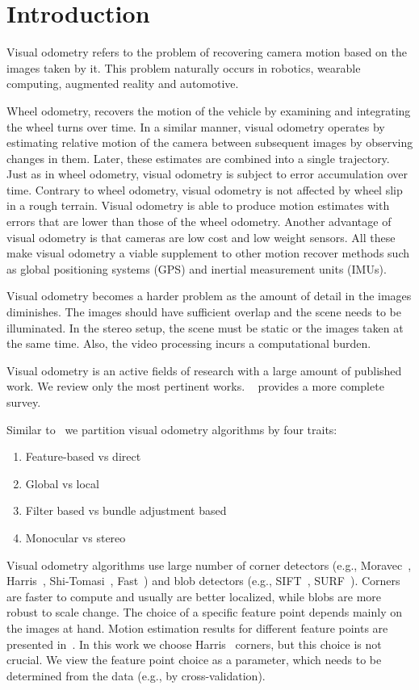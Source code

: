 \chapter{Introduction}
\label{chap:intro}

Visual odometry refers to the problem of recovering camera motion
based on the images taken by it. This problem naturally occurs in
robotics, wearable computing, augmented reality and automotive.

Wheel odometry, recovers the motion of the vehicle by examining and
integrating the wheel turns over time.  In a similar manner, visual
odometry operates by estimating relative motion of the camera between
subsequent images by observing changes in them. Later, these estimates
are combined into a single trajectory. Just as in wheel odometry,
visual odometry is subject to error accumulation over time. Contrary
to wheel odometry, visual odometry is not affected by wheel slip in a
rough terrain. Visual odometry is able to produce motion estimates
with errors that are lower than those of the wheel odometry. Another
advantage of visual odometry is that cameras are low cost and low
weight sensors.  All these make visual odometry a viable supplement to
other motion recover methods such as global positioning systems (GPS)
and inertial measurement units (IMUs).

Visual odometry becomes a harder problem as the amount of detail in
the images diminishes. The images should have sufficient overlap and
the scene needs to be illuminated.  In the stereo setup, the scene
must be static or the images taken at the same time. Also, the video
processing incurs a computational burden.

Visual odometry is an active fields of research with a large amount of
published work.  We review only the most pertinent works.
~\cite{Scaramuzza2011} provides a more complete survey.

Similar to~\cite{Persson2015} we partition visual odometry algorithms
by four traits:
\begin{enumerate}
\item Feature-based vs direct
\item Global vs local
\item Filter based vs bundle adjustment based
\item Monocular vs stereo
\end{enumerate}

Visual odometry algorithms use large number of corner detectors
(e.g., Moravec~\cite{Moravec1980}, Harris~\cite{Harris1987},
Shi-Tomasi~\cite{Shi1994}, Fast~\cite{Rosten2006}) and blob detectors
(e.g., SIFT~\cite{Lowe2004}, SURF~\cite{Bay2006}). Corners are faster to
compute and usually are better localized, while blobs are more robust
to scale change. The choice of a specific feature point depends mainly
on the images at hand.  Motion estimation results for different
feature points are presented in~\cite{Govender2009}. In this work we
choose Harris~\cite{Harris1987} corners, but this choice is not
crucial. We view the feature point choice as a parameter, which needs
to be determined from the data (e.g., by cross-validation).

